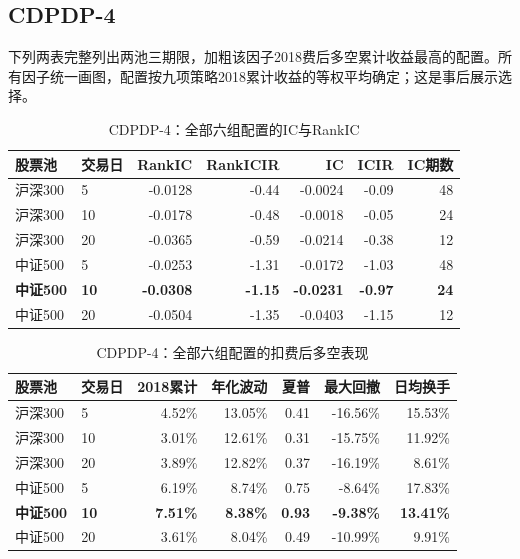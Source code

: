 \subsection{CDPDP-4}
下列两表完整列出两池三期限，加粗该因子2018费后多空累计收益最高的配置。所有因子统一画图，配置按九项策略2018累计收益的等权平均确定；这是事后展示选择。
\begin{table}[H]\centering\normalsize\setlength{\tabcolsep}{3.5pt}
\caption{CDPDP-4：全部六组配置的IC与RankIC}\begin{tabular}{llrrrrr}\toprule
股票池 & 交易日 & RankIC & RankICIR & IC & ICIR & IC期数\\\midrule
沪深300 & 5 & -0.0128 & -0.44 & -0.0024 & -0.09 & 48 \\
沪深300 & 10 & -0.0178 & -0.48 & -0.0018 & -0.05 & 24 \\
沪深300 & 20 & -0.0365 & -0.59 & -0.0214 & -0.38 & 12 \\
中证500 & 5 & -0.0253 & -1.31 & -0.0172 & -1.03 & 48 \\
\textbf{中证500} & \textbf{10} & \textbf{-0.0308} & \textbf{-1.15} & \textbf{-0.0231} & \textbf{-0.97} & \textbf{24} \\
中证500 & 20 & -0.0504 & -1.35 & -0.0403 & -1.15 & 12 \\
\bottomrule\end{tabular}\end{table}
\begin{table}[H]\centering\normalsize\setlength{\tabcolsep}{3.5pt}
\caption{CDPDP-4：全部六组配置的扣费后多空表现}\begin{tabular}{llrrrrr}\toprule
股票池 & 交易日 & 2018累计 & 年化波动 & 夏普 & 最大回撤 & 日均换手\\\midrule
沪深300 & 5 & 4.52\% & 13.05\% & 0.41 & -16.56\% & 15.53\% \\
沪深300 & 10 & 3.01\% & 12.61\% & 0.31 & -15.75\% & 11.92\% \\
沪深300 & 20 & 3.89\% & 12.82\% & 0.37 & -16.19\% & 8.61\% \\
中证500 & 5 & 6.19\% & 8.74\% & 0.75 & -8.64\% & 17.83\% \\
\textbf{中证500} & \textbf{10} & \textbf{7.51\%} & \textbf{8.38\%} & \textbf{0.93} & \textbf{-9.38\%} & \textbf{13.41\%} \\
中证500 & 20 & 3.61\% & 8.04\% & 0.49 & -10.99\% & 9.91\% \\
\bottomrule\end{tabular}\end{table}
\clearpage
{}
\clearpage
